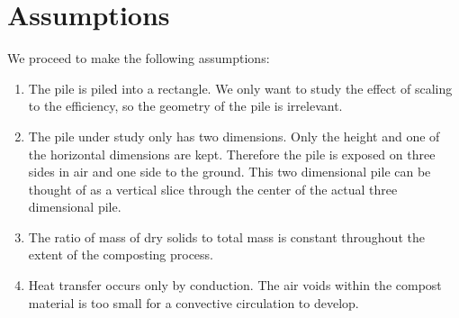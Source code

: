 \documentclass[12pt, letterpaper, titlepage]{article}
\begin{document}
\section{Assumptions}
We proceed to make the following assumptions:
\begin{enumerate}
    \item The pile is piled into a rectangle. We only want to study the effect of scaling to the efficiency, so the geometry of the pile is irrelevant.
    \item The pile under study only has two dimensions. Only the height and one of the horizontal dimensions are kept. Therefore the pile is exposed on three sides in air and one side to the ground. This two dimensional pile can be thought of as a vertical slice through the center of the actual three dimensional pile.
    \item The ratio of mass of dry solids to total mass is constant throughout the extent of the composting process.
    \item Heat transfer occurs only by conduction. The air voids within the compost material is too small for a convective circulation to develop.
\end{enumerate}
\newpage
\end{document}
